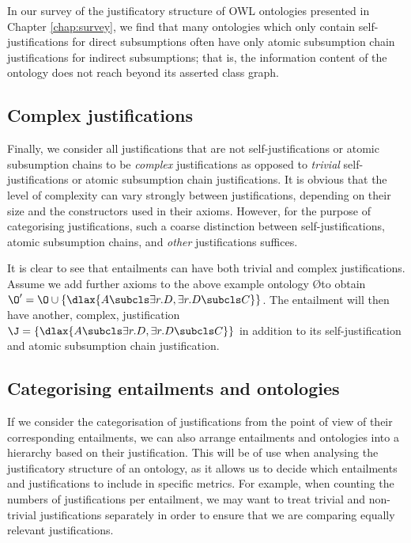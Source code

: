 In our survey of the justificatory structure of OWL ontologies presented in Chapter \ref{chap:survey}, we find that many ontologies which only contain self-justifications for direct subsumptions often have only atomic subsumption chain justifications for indirect subsumptions; that is, the information content of the ontology does not reach beyond its asserted class graph. 

\subsection{Complex justifications}
\label{sec:complexjusts}

Finally, we consider all justifications that are not self-justifications or atomic subsumption chains to be \emph{complex} justifications as opposed to \emph{trivial} self-justifications or atomic subsumption chain justifications. It is obvious that the level of complexity can vary strongly between justifications, depending on their size and the constructors used in their axioms. However, for the purpose of categorising justifications, such a coarse distinction between self-justifications, atomic subsumption chains, and \emph{other} justifications suffices.

It is clear to see that entailments can have both trivial and complex justifications. Assume we add further axioms to the above example ontology \O to obtain $\O' = \O \cup \{ \dlax{A \subcls \exists r.D, \exists r.D \subcls C}\}$. The entailment  will then have another, complex, justification $\J = \{ \dlax{A \subcls \exists r.D, \exists r.D \subcls C}\}$ in addition to its self-justification and atomic subsumption chain justification.


\subsection{Categorising entailments and ontologies}

If we consider the categorisation of justifications from the point of view of their corresponding entailments, we can also arrange entailments and ontologies into a hierarchy based on their justification. This will be of use when analysing the justificatory structure of an ontology, as it allows us to decide which entailments and justifications to include in specific metrics. For example, when counting the numbers of justifications per entailment, we may want to treat trivial and non-trivial justifications separately in order to ensure that we are comparing equally relevant justifications. 

